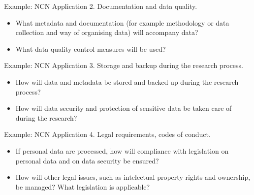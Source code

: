 \documentclass[10pt]{beamer}
\begin{document}
\begin{frame}{Example: NCN Application}
\textcolor{subtitle}{2. Documentation and data quality.}
  \begin{itemize}
    \item What metadata and documentation (for example methodology or data collection and way of organising data) will accompany data?
    \\
    {\color{gray}{Very important: you have to explain what is in your data and how to use it (e.g., README files, code documentation).}}
    \item What data quality control measures will be used?
    \\
    {\color{gray}{Are there any automatic protocols that you can use to ensure that your data is of highest quality? Doing it by hand may be very exhausting and does not exclude human error.}}
  \end{itemize}
\end{frame}

\begin{frame}{Example: NCN Application}
\textcolor{subtitle}{3. Storage and backup during the research process.}
  \begin{itemize}
    \item How will data and metadata be stored and backed up during the research process?
    \\
    {\color{gray}{Backups, best to use version control server (Zenodo, GitHub)}}
    \item How will data security and protection of sensitive data be taken care of during the research?
    \\
    {\color{gray}{For instance, when dealing with patient records.}}
  \end{itemize}
\end{frame}

\begin{frame}{Example: NCN Application}
\textcolor{subtitle}{4. Legal requirements, codes of conduct.}
  \begin{itemize}
    \item If personal data are processed, how will compliance with legislation on personal data and on data security be ensured?
    \item How will other legal issues, such as intelectual property rights and ownership, be managed? What legislation is applicable?
    \\
    {\color{gray}{Licences.}}
  \end{itemize}
\end{frame}
\end{document}
